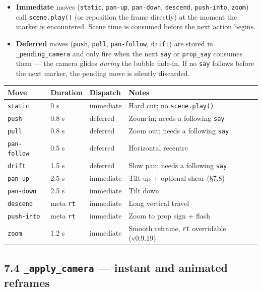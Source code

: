 \documentclass[
  11pt,
]{book}
\providecommand{\tightlist}{%
  \setlength{\itemsep}{0pt}\setlength{\parskip}{0pt}}
\begin{document}
\begin{itemize}
\tightlist
\item
  \textbf{Immediate} moves (\texttt{static}, \texttt{pan-up},
  \texttt{pan-down}, \texttt{descend}, \texttt{push-into},
  \texttt{zoom}) call \texttt{scene.play()} (or reposition the frame
  directly) at the moment the marker is encountered.  Scene time is
  consumed before the next action begins.
\item
  \textbf{Deferred} moves (\texttt{push}, \texttt{pull},
  \texttt{pan-follow}, \texttt{drift}) are stored in
  \texttt{\_pending\_camera} and only fire when the next \texttt{say} or
  \texttt{prop\_say} consumes them — the camera glides \emph{during} the
  bubble fade-in.  If no \texttt{say} follows before the next marker,
  the pending move is silently discarded.
\end{itemize}

\begin{longtable}[]{@{}llll@{}}
\toprule\noalign{}
Move & Duration & Dispatch & Notes \\
\midrule\noalign{}
\endhead
\bottomrule\noalign{}
\endlastfoot
\texttt{static}     & 0 s    & immediate & Hard cut; no \texttt{scene.play()} \\
\texttt{push}       & 0.8 s  & deferred  & Zoom in; needs a following \texttt{say} \\
\texttt{pull}       & 0.8 s  & deferred  & Zoom out; needs a following \texttt{say} \\
\texttt{pan-follow} & 0.5 s  & deferred  & Horizontal recentre \\
\texttt{drift}      & 1.5 s  & deferred  & Slow pan; needs a following \texttt{say} \\
\texttt{pan-up}     & 2.5 s  & immediate & Tilt up + optional shear (§7.8) \\
\texttt{pan-down}   & 2.5 s  & immediate & Tilt down \\
\texttt{descend}    & meta \texttt{rt} & immediate & Long vertical travel \\
\texttt{push-into}  & meta \texttt{rt} & immediate & Zoom to prop sign + flash \\
\texttt{zoom}       & 1.2 s  & immediate & Smooth reframe, \texttt{rt} overridable (v0.9.19) \\
\end{longtable}

\subsection{\texorpdfstring{7.4 \texttt{\_apply\_camera} --- instant and
animated
reframes}{7.4 \_apply\_camera --- instant and animated reframes}}\label{apply_camera-instant-and-animated-reframes}
\end{document}
